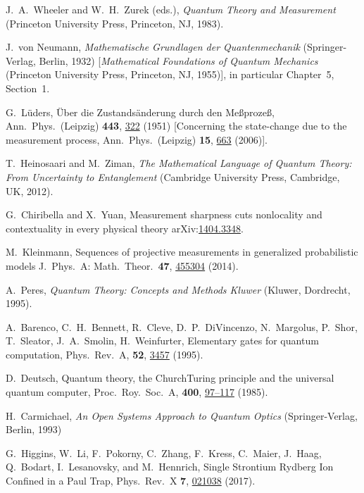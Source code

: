 \documentclass[
aps,prl,
reprint,
a4paper,
superscriptaddress,
floatfix,
]{revtex4-1}
\renewcommand{\doi}[2]{{\href{http://doi.org/#1}{#2}}}
\newcommand{\XXX}[1]{{\color{red}[\texttt{XXX}~{#1}~\texttt{XXX}]}}
\begin{document}
\begin{thebibliography}{99}

%
J.\ A.\ Wheeler and W.\ H.\ Zurek (eds.),
\emph{Quantum Theory and Measurement}
(Princeton University Press, Princeton, NJ, 1983).

%
J.\ von Neumann,
\emph{Mathematische Grundlagen der Quantenmechanik}
(Springer-Verlag, Berlin, 1932)
[\emph{Mathematical Foundations of Quantum Mechanics}
(Princeton University Press, Princeton, NJ, 1955)],
in particular Chapter~5, Section~1.

%
G.\ Lüders,
Über die Zustandsänderung durch den Meßprozeß,
Ann.\ Phys.\ (Leipzig) \textbf{443}, \doi{10.1002/andp.19504430510}{322} (1951)
[Concerning the state-change due to the measurement process,
Ann.\ Phys.\ (Leipzig) \textbf{15}, \doi{10.1002/andp.200610207}{663} (2006)].

%
T.\ Heinosaari and M.\ Ziman,
\emph{The Mathematical Language of Quantum Theory: From Uncertainty to Entanglement}
(Cambridge University Press, Cambridge, UK, 2012).

%
G.\ Chiribella and X.\ Yuan,
Measurement sharpness cuts nonlocality and contextuality in every physical theory
arXiv:\href{https://arXiv.org/abs/1404.3348}{1404.3348}.

%
M.\ Kleinmann,
Sequences of projective measurements in generalized probabilistic models
J.\ Phys.\ A: Math.\ Theor.\ \textbf{47}, \doi{10.1088/1751-8113/47/45/455304}{455304} (2014).

%
A.\ Peres,
\emph{Quantum Theory: Concepts and Methods Kluwer}
(Kluwer, Dordrecht, 1995).

%
A.\ Barenco, C.\ H.\ Bennett, R.\ Cleve, D.\ P.\ DiVincenzo, N.\ Margolus, P.\ Shor, T.\ Sleator, J.\ A.\ Smolin, H.\ Weinfurter,
Elementary gates for quantum computation,
Phys.\ Rev.\ A, \textbf{52}, \doi{10.1103/PhysRevA.52.3457}{3457} (1995).

%
D.\ Deutsch,
Quantum theory, the Church{\textendash}Turing principle and the universal quantum computer,
Proc.\ Roy.\ Soc.\ A, \textbf{400}, \doi{10.1098/rspa.1985.0070}{97--117} (1985).

%
H.\ Carmichael,
\emph{An Open Systems Approach to Quantum Optics}
(Springer-Verlag, Berlin, 1993) 


%
G.\ Higgins, W.\ Li, F.\ Pokorny, C.\ Zhang, F.\ Kress, C.\ Maier, J.\ Haag, Q.\ Bodart, I.\ Lesanovsky, and M.\ Hennrich,
Single Strontium Rydberg Ion Confined in a Paul Trap,
Phys.\ Rev.\ X \textbf{7}, \doi{10.1103/PhysRevX.7.021038}{021038} (2017).


\end{thebibliography}
\end{document}
